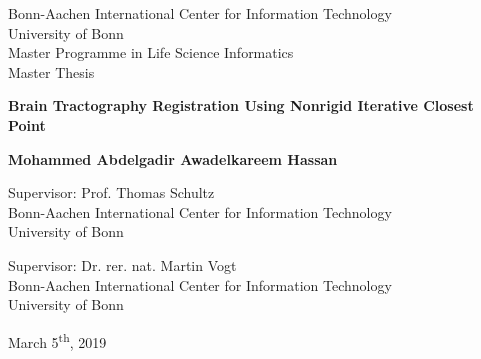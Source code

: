 \documentclass[../structure.tex]{subfiles}
\begin{document}
\begin{titlepage}
\begin{center}
		\vspace*{1cm}
        
        Bonn-Aachen International Center for Information Technology\\
        University of Bonn\\
        Master Programme in Life Science Informatics \\
        Master Thesis \\
        
        \vspace{2cm}
        
        \fontsize{18pt}{20pt}\selectfont
        \textbf{Brain Tractography Registration Using Nonrigid Iterative Closest Point}
        
        \vspace{2cm}
        
        \fontsize{14pt}{20pt}\selectfont
        \textbf{Mohammed Abdelgadir Awadelkareem Hassan}
        
        \vspace{1.5cm}
        
        
        \vspace{0.2cm}
        Supervisor: Prof. Thomas Schultz \\Bonn-Aachen International Center for Information Technology \\University of Bonn
        
        \vspace{0.7cm}
        Supervisor: Dr. rer. nat. Martin Vogt \\Bonn-Aachen International Center for Information Technology \\University of Bonn
        
        
        \vspace{2cm}
        
        
        March 5\textsuperscript{th}, 2019
       
        \vspace{0.8cm}
    \end{center}
\end{titlepage}
\end{document}
